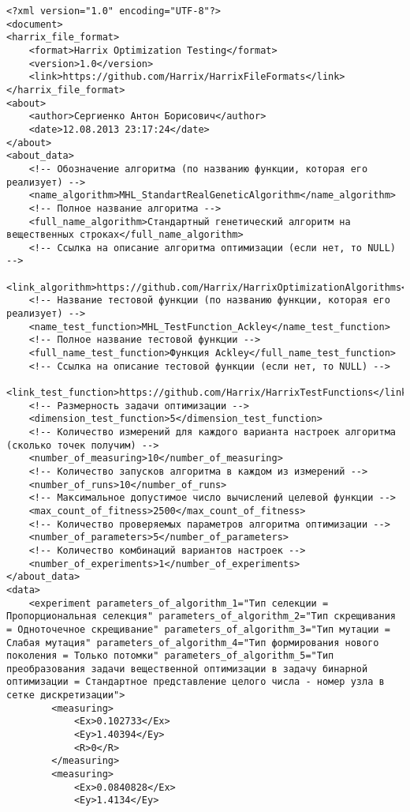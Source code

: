 \documentclass[a4paper,12pt]{article}
\begin{document}
\begin{lstlisting}[label=Example01,caption=Пример части файла Harrix Optimization Testing]
<?xml version="1.0" encoding="UTF-8"?>
<document>
<harrix_file_format>
	<format>Harrix Optimization Testing</format>
	<version>1.0</version>
	<link>https://github.com/Harrix/HarrixFileFormats</link>
</harrix_file_format>
<about>
	<author>Сергиенко Антон Борисович</author>
	<date>12.08.2013 23:17:24</date>
</about>
<about_data>
	<!-- Обозначение алгоритма (по названию функции, которая его реализует) -->
	<name_algorithm>MHL_StandartRealGeneticAlgorithm</name_algorithm>
	<!-- Полное название алгоритма -->
	<full_name_algorithm>Стандартный генетический алгоритм на вещественных строках</full_name_algorithm>
	<!-- Ссылка на описание алгоритма оптимизации (если нет, то NULL) -->
	<link_algorithm>https://github.com/Harrix/HarrixOptimizationAlgorithms</link_algorithm>
	<!-- Название тестовой функции (по названию функции, которая его реализует) -->
	<name_test_function>MHL_TestFunction_Ackley</name_test_function>
	<!-- Полное название тестовой функции -->
	<full_name_test_function>Функция Ackley</full_name_test_function>
	<!-- Ссылка на описание тестовой функции (если нет, то NULL) -->
	<link_test_function>https://github.com/Harrix/HarrixTestFunctions</link_test_function>
	<!-- Размерность задачи оптимизации -->
	<dimension_test_function>5</dimension_test_function>
	<!-- Количество измерений для каждого варианта настроек алгоритма (сколько точек получим) -->
	<number_of_measuring>10</number_of_measuring>
	<!-- Количество запусков алгоритма в каждом из измерений -->
	<number_of_runs>10</number_of_runs>
	<!-- Максимальное допустимое число вычислений целевой функции -->
	<max_count_of_fitness>2500</max_count_of_fitness>
	<!-- Количество проверяемых параметров алгоритма оптимизации -->
	<number_of_parameters>5</number_of_parameters>
	<!-- Количество комбинаций вариантов настроек -->
	<number_of_experiments>1</number_of_experiments>
</about_data>
<data>
	<experiment parameters_of_algorithm_1="Тип селекции = Пропорциональная селекция" parameters_of_algorithm_2="Тип скрещивания = Одноточечное скрещивание" parameters_of_algorithm_3="Тип мутации = Слабая мутация" parameters_of_algorithm_4="Тип формирования нового поколения = Только потомки" parameters_of_algorithm_5="Тип преобразования задачи вещественной оптимизации в задачу бинарной оптимизации = Стандартное представление целого числа - номер узла в сетке дискретизации">
		<measuring>
			<Ex>0.102733</Ex>
			<Ey>1.40394</Ey>
			<R>0</R>
		</measuring>
		<measuring>
			<Ex>0.0840828</Ex>
			<Ey>1.4134</Ey>

\end{lstlisting}
\end{document}

